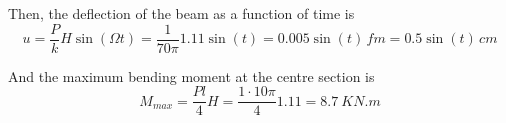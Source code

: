 \begin{Answer}[ref={moving_load}]
Then, the deflection of the beam as a function of time is
$$
u = \frac{P}{k}H\sin(\Omega t) = \frac{1}{70\pi}1.11\sin(t) = 0.005\sin(t)\,f\si{m} = 0.5\sin(t)\,\si{cm}
$$

And the maximum bending moment at the centre section is
$$
M_{max} = \frac{Pl}{4}H = \frac{1 \cdot 10\pi}{4}1.11 = \SI{8.7}{KN.m}
$$
\end{Answer}
